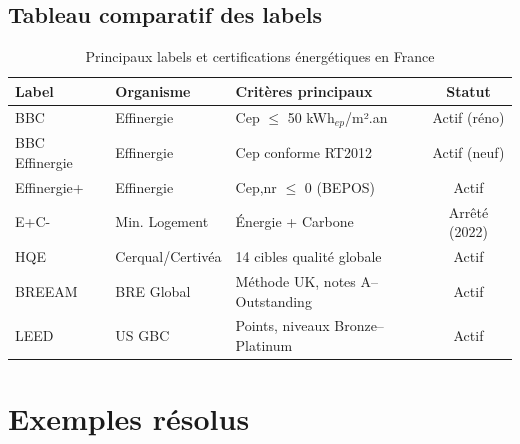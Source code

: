\subsection{Tableau comparatif des labels}

\begin{table}[H]
  \centering
  \begin{tabularx}{\linewidth}{lXXc}
    \toprule
    Label & Organisme & Critères principaux & Statut \\
    \midrule
    BBC & Effinergie & Cep $\leq$ 50 kWh$_{ep}$/m².an & Actif (réno) \\
    BBC Effinergie & Effinergie & Cep conforme RT2012 & Actif (neuf) \\
    Effinergie+ & Effinergie & Cep,nr $\leq$ 0 (BEPOS) & Actif \\
    E+C- & Min. Logement & Énergie + Carbone & Arrêté (2022) \\
    HQE & Cerqual/Certivéa & 14 cibles qualité globale & Actif \\
    BREEAM & BRE Global & Méthode UK, notes A--Outstanding & Actif \\
    LEED & US GBC & Points, niveaux Bronze--Platinum & Actif \\
    \bottomrule
  \end{tabularx}
  \caption{Principaux labels et certifications énergétiques en France}
\end{table}

\section{Exemples résolus}

